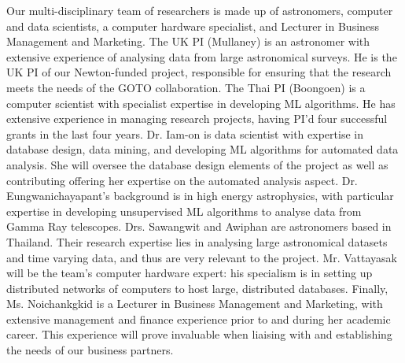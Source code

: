 \documentclass[11pt]{article}
\begin{document}
  \noindent
  Our multi-disciplinary team of researchers is made up of astronomers, computer and data scientists, a computer hardware specialist, and Lecturer in Business Management and Marketing. The UK PI (Mullaney) is an astronomer with extensive experience of analysing data from large astronomical surveys. He is the UK PI of our Newton-funded project, responsible for ensuring that the research meets the needs of the GOTO collaboration. The Thai PI (Boongoen) is a computer scientist with specialist expertise in developing ML algorithms. He has extensive experience in managing research projects, having PI'd four successful grants in the last four years. Dr. Iam-on is data scientist with expertise in database design, data mining, and developing ML algorithms for automated data analysis. She will oversee the database design elements of the project as well as contributing offering her expertise on the automated analysis aspect. Dr. Eungwanichayapant's background is in high energy astrophysics, with particular expertise in developing unsupervised ML algorithms to analyse data from Gamma Ray telescopes. Drs. Sawangwit and Awiphan are astronomers based in Thailand. Their research expertise lies in analysing large astronomical datasets and time varying data, and thus are very relevant to the project. Mr. Vattayasak will be the team's computer hardware expert: his specialism is in setting up distributed networks of computers to host large, distributed databases. Finally, Ms. Noichankgkid is a Lecturer in Business Management and Marketing, with extensive management and finance experience prior to and during her academic career. This experience will prove invaluable when liaising with and establishing the needs of our business partners. 
  
  
  
  
\end{document}
